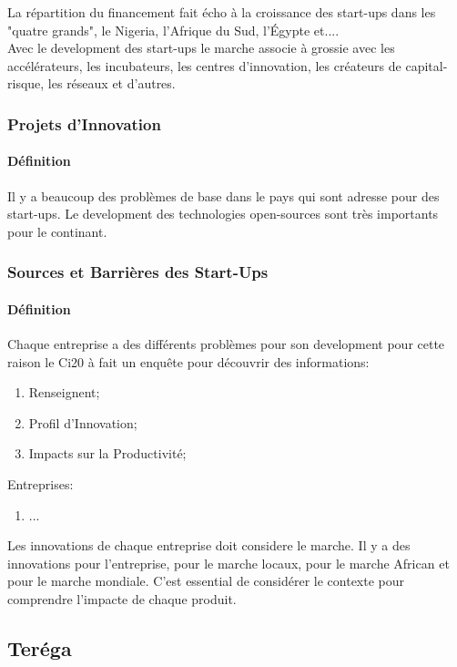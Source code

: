 \documentclass{article}
\begin{document}
\noindent La répartition du financement fait écho à la croissance des start-ups dans les "quatre grands", le Nigeria, l'Afrique du Sud, l'Égypte et....\\

\noindent Avec le development des start-ups le marche associe à grossie avec les  accélérateurs, les incubateurs, les centres d'innovation, les créateurs de capital-risque, les réseaux et d'autres.\\

\subsubsection{Projets d'Innovation}
\paragraph{Définition}Il y a beaucoup des problèmes de base dans le pays qui sont adresse pour des start-ups. Le development des technologies open-sources sont très importants pour le continant.

\subsubsection{Sources et Barrières des Start-Ups}
\paragraph{Définition}Chaque entreprise a des différents problèmes pour son development pour cette raison le Ci20 à fait un enquête pour découvrir des informations:
\begin{enumerate}[noitemsep]
    \item Renseignent;
    \item Profil d'Innovation;
    \item Impacts sur la Productivité;
\end{enumerate}
\noindent Entreprises:
\begin{enumerate}[noitemsep]
    \item ...
\end{enumerate}
\noindent Les innovations de chaque entreprise doit considere le marche. Il y a des innovations pour l'entreprise, pour le marche locaux, pour le marche African et pour le marche mondiale. C'est essential de considérer le contexte pour comprendre l'impacte de chaque produit.\\

\newpage\subsection{Teréga}
\end{document}
